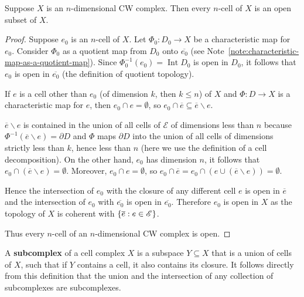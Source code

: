 \begin{prop}{5.5}
	Suppose \( X \) is an \( n \)-dimensional CW complex. Then every \( n \)-cell of \( X \) is an open subset of \( X \).
\end{prop}

\begin{proof}
	Suppose \( e_{0} \) is an \( n \)-cell of \( X \). Let \( \Phi_{0}: D_{0} \to X \) be a characteristic map for \( e_{0} \). Consider \( \Phi_{0} \) as a quotient map from \( D_{0} \) onto \( \overline{e_{0}} \) (see Note~\ref{note:characteristic-map-as-a-quotient-map}). Since \( \Phi_{0}^{-1}(e_{0}) = \operatorname{Int} D_{0} \) is open in \( D_{0} \), it follows that \( e_{0} \) is open in \( \overline{e_{0}} \) (the definition of quotient topology).

	If \( e \) is a cell other than \( e_{0} \) (of dimension \( k \), then \( k \leq n \)) of \( X \) and \( \Phi: D \to X \) is a characteristic map for \( e \), then \( e_{0} \cap e = \emptyset \), so \( e_{0} \cap \overline{e} \subseteq \overline{e} \smallsetminus e \).

	\( \overline{e}\smallsetminus e \) is contained in the union of all cells of \( \mathscr{E} \) of dimensions less than \( n \) because \( \Phi^{-1}(\overline{e}\smallsetminus e) = \partial D \) and \( \Phi \) maps \( \partial D \) into the union of all cells of dimensions strictly less than \( k \), hence less than \( n \) (here we use the definition of a cell decomposition). On the other hand, \( e_{0} \) has dimension \( n \), it follows that \( e_{0} \cap (\overline{e}\smallsetminus e) = \emptyset \). Moreover, \( e_{0} \cap e = \emptyset \), so \( e_{0} \cap \overline{e} = e_{0} \cap (e \cup (\overline{e}\smallsetminus e)) = \emptyset \).

	Hence the intersection of \( e_{0} \) with the closure of any different cell \( e \) is open in \( \overline{e} \) and the intersection of \( e_{0} \) with \( \overline{e_{0}} \) is open in \( \overline{e_{0}} \). Therefore \( e_{0} \) is open in \( X \) as the topology of \( X \) is coherent with \( \left\{{ \overline{e}: e \in \mathscr{E} }\right\} \).

	Thus every \( n \)-cell of an \( n \)-dimensional CW complex is open.
\end{proof}

A \textbf{subcomplex} of a cell complex \( X \) is a subspace \( Y \subseteq X \) that is a union of cells of \( X \), such that if \( Y \) contains a cell, it also contains its closure. It follows directly from this definition that the union and the intersection of any collection of subcomplexes are subcomplexes.

